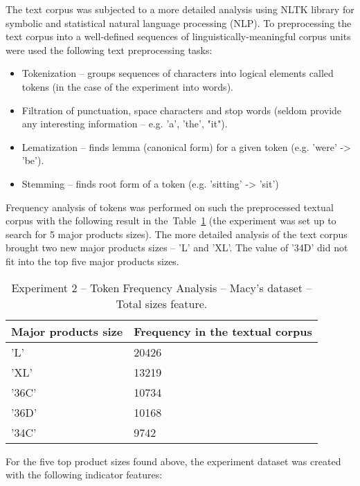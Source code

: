 					The text corpus was subjected to a more detailed analysis using NLTK library for symbolic and statistical natural language processing (NLP). To preprocessing the text corpus into a well-defined sequences of linguistically-meaningful corpus units were used the following text preprocessing tasks:	
					\begin{itemize}
						\item Tokenization -- groups sequences of characters into logical elements called tokens (in the case of the experiment into words).
						\item Filtration of punctuation, space characters and stop words (seldom provide any interesting information  -- e.g. 'a', 'the', "it").
						\item Lematization -- finds lemma (canonical form) for a given token (e.g. 'were' -> 'be').
						\item Stemming -- finds root form of a token (e.g. 'sitting' -> 'sit')
					\end{itemize}
					
					Frequency analysis of tokens was performed on such the preprocessed textual corpus with the following result in the~Table~\ref{tab:exp2-token-frequency-analysis-macys} (the experiment was set up to search for 5 major products sizes). The more detailed analysis of the text corpus brought two new major products sizes -- 'L' and 'XL'. The value of '34D' did not fit into the top five major products sizes.
							 	
										\begin{table}[!h]
\caption{Experiment 2 -- Token Frequency Analysis -- Macy's dataset -- Total sizes feature.}\label{tab:exp2-token-frequency-analysis-macys}
\begin{tabular}{|l|l|}
\hline
\textbf{Major products size}                                     & \textbf{Frequency in the textual corpus} \\ \hline
'L'                            & 20426           \\ \hline
'XL'     & 13219            \\ \hline
'36C'     & 10734            \\ \hline
'36D'     & 10168            \\ \hline
'34C'     & 9742            \\ \hline
\end{tabular}
\end{table}

					For the five top product sizes found above, the experiment  dataset was created with the following indicator features:
					
